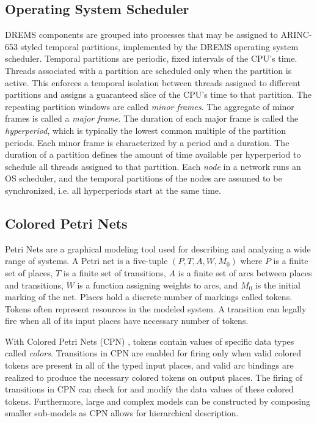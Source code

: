 \subsection{Operating System Scheduler}
DREMS components are grouped into processes that may be assigned to ARINC-653 \cite{ARINC-653} styled temporal partitions, implemented by the DREMS operating system scheduler. Temporal partitions are periodic, fixed intervals of the CPU's time. Threads associated with a partition are scheduled only when the partition is active. This enforces a temporal isolation between threads assigned to different partitions and assigns a guaranteed slice of the CPU's time to that partition. The repeating partition windows are called \emph{minor frames}. The aggregate of minor frames is called a \emph{major frame}. The duration of each major frame is called the \emph{hyperperiod}, which is typically the lowest common multiple of the partition periods. Each minor frame is characterized by a period and a duration. The duration of a partition defines the amount of time available per hyperperiod to schedule all threads assigned to that partition. Each \emph{node} in a network runs an OS scheduler, and the temporal partitions of the nodes are assumed to be synchronized, i.e. all hyperperiods start at the same time. 

\subsection{Colored Petri Nets}
Petri Nets \cite{Murata1989} are a graphical modeling tool used for describing and analyzing a wide range of systems. A Petri net is a five-tuple $(P, T, A, W, M_0)$ where $P$ is a finite set of places, $T$ is a finite set of transitions, $A$ is a finite set of arcs between places and transitions, $W$ is a function assigning weights to arcs, and $M_0$ is the initial marking of the net. Places hold a discrete number of markings called tokens. Tokens often represent resources in the modeled system. A transition can legally fire when all of its input places have necessary number of tokens. 

With Colored Petri Nets (CPN) \cite{CPN}, tokens contain values of specific data types called \emph{colors}. Transitions in CPN are enabled for firing only when valid colored tokens are present in all of the typed input places, and valid arc bindings are realized to produce the necessary colored tokens on output places. The firing of transitions in CPN can check for and modify the data values of these colored tokens. Furthermore, large and complex models can be constructed by composing smaller sub-models as CPN allows for hierarchical description.

